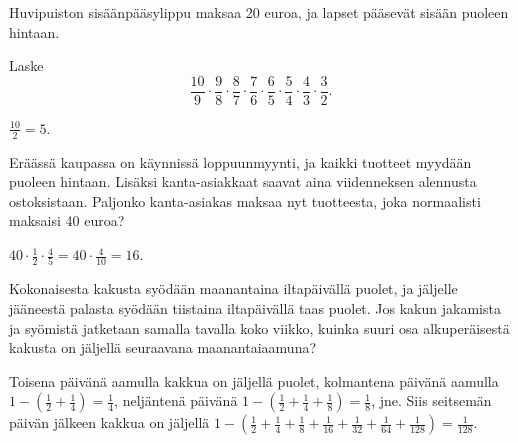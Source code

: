 \begin{tehtavasivu}
\begin{tehtava} %
    Huvipuiston sisäänpääsylippu maksaa 20 euroa, ja lapset pääsevät sisään puoleen hintaan.
	\begin{alakohdat}
    \end{alakohdat}
    \begin{vastaus}
		\begin{alakohdat}
		\end{alakohdat} 
    \end{vastaus}
\end{tehtava}  
  
\begin{tehtava}
    Laske 
    \[ \frac{10}{9}\cdot \frac{9}{8}\cdot \frac{8}{7}\cdot \frac{7}{6}\cdot \frac{6}{5}
    \cdot \frac{5}{4}\cdot \frac{4}{3}\cdot \frac{3}{2}. \]
    \begin{vastaus}
		$\frac{10}{2}=5$.
    \end{vastaus}        
\end{tehtava}
    
\begin{tehtava}
	Eräässä kaupassa on käynnissä loppuunmyynti, ja kaikki tuotteet
    myydään puoleen hintaan. Lisäksi kanta-asiakkaat saavat aina
    viidenneksen alennusta ostoksistaan.
	Paljonko kanta-asiakas maksaa nyt tuotteesta, joka normaalisti
    maksaisi 40 euroa?
    \begin{vastaus}
		$40\cdot \frac{1}{2} \cdot \frac{4}{5}=40\cdot \frac{4}{10}= 16$. 
	\end{vastaus}
\end{tehtava}
    
\begin{tehtava}
	Kokonaisesta kakusta syödään maanantaina iltapäivällä puolet, ja jäljelle
	jääneestä palasta syödään tiistaina iltapäivällä taas puolet.
	Jos kakun jakamista ja syömistä jatketaan samalla tavalla koko viikko,
	kuinka suuri osa alkuperäisestä kakusta on
	jäljellä seuraavana maanantaiaamuna?
	\begin{vastaus}
		Toisena päivänä aamulla kakkua on jäljellä puolet, kolmantena
		päivänä aamulla
		$1-\left(\frac{1}{2} + \frac{1}{4}\right) = \frac{1}{4}$, 
		neljäntenä päivänä
		$1-\left(\frac{1}{2} + \frac{1}{4} + \frac{1}{8}\right)
		= \frac{1}{8}$, jne.
		Siis seitsemän päivän jälkeen kakkua on jäljellä
		$1-\left(\frac{1}{2} + \frac{1}{4} + \frac{1}{8} +
		\frac{1}{16} + \frac{1}{32} + \frac{1}{64} + \frac{1}{128}\right)
		= \frac{1}{128}$.  
	\end{vastaus}
\end{tehtava}


\end{tehtavasivu}
